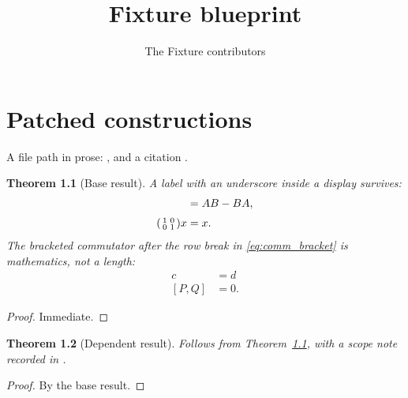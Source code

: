 \documentclass{report}
\title{Fixture blueprint}
\author{The Fixture contributors}
\newtheorem{theorem}{Theorem}
\begin{document}
\maketitle

\chapter{Patched constructions}

A file path in prose: , and a citation
\cite{Model2020}.

\begin{samepage}
\begin{theorem}[Base result]
    \label{thm:base_result}
    \leanok
    A label with an underscore inside a display survives:
    \begin{align}
        [A, B] &= AB - BA, \label{eq:comm_bracket}\\[\jot]
        \begin{psmallmatrix} 1 & 0 \\ 0 & 1 \end{psmallmatrix} x &= x.
    \end{align}
    The bracketed commutator after the row break in
    \eqref{eq:comm_bracket} is mathematics, not a length:
    \begin{align}
        c &= d \\
        [P, Q] &= 0.
    \end{align}
\end{theorem}
\begin{proof}\leanok Immediate. \end{proof}
\end{samepage}

\begin{theorem}[Dependent result]
    \label{thm:dependent_result}
    \leanok
    Follows from Theorem~\ref{thm:base_result}, with a scope note recorded in
    .
\end{theorem}
\begin{proof}\leanok{} By the base result. \end{proof}



\end{document}
